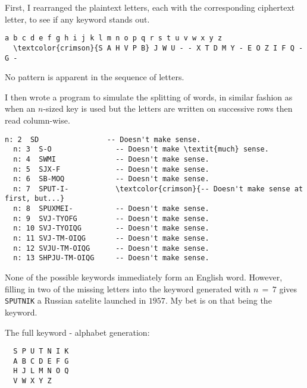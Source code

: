\begin{Answer}

First, I rearranged the plaintext letters, each with the corresponding ciphertext letter,
to see if any keyword stands out.

\begin{Verbatim}[commandchars=\\\{\}]
  a b c d e f g h i j k l m n o p q r s t u v w x y z
  \textcolor{crimson}{S A H V P B} J W U - - X T D M Y - E O Z I F Q - G -
\end{Verbatim}

\noindent
No pattern is apparent in the sequence of letters.

\vspace{5pt}
\noindent
I then wrote a program to simulate the splitting of words,
in similar fashion as when an $n$-sized key is used but the letters are
written on successive rows then read column-wise. 
\begin{Verbatim}[commandchars=\\\{\}]
  n: 2  SD                -- Doesn't make sense.
  n: 3  S-O               -- Doesn't make \textit{much} sense.
  n: 4  SWMI              -- Doesn't make sense.
  n: 5  SJX-F             -- Doesn't make sense. 
  n: 6  SB-MOQ            -- Doesn't make sense.
  n: 7  SPUT-I-           \textcolor{crimson}{-- Doesn't make sense at first, but...}
  n: 8  SPUXMEI-          -- Doesn't make sense.
  n: 9  SVJ-TYOFG         -- Doesn't make sense.
  n: 10 SVJ-TYOIQG        -- Doesn't make sense.
  n: 11 SVJ-TM-OIQG       -- Doesn't make sense.
  n: 12 SVJU-TM-OIQG      -- Doesn't make sense.
  n: 13 SHPJU-TM-OIQG     -- Doesn't make sense.
\end{Verbatim}

\noindent
None of the possible keywords immediately form an English word.
However, filling in two of the missing letters into the keyword generated with $n \, = \, 7$ gives
\color{crimson} \verb|SPUTNIK| \color{black} a Russian satelite launched in $1957$.
My bet is on that being the keyword.

\noindent
The full keyword - alphabet generation:

\begin{Verbatim}
  S P U T N I K
  A B C D E F G
  H J L M N O Q
  V W X Y Z
\end{Verbatim}
\end{Answer}

